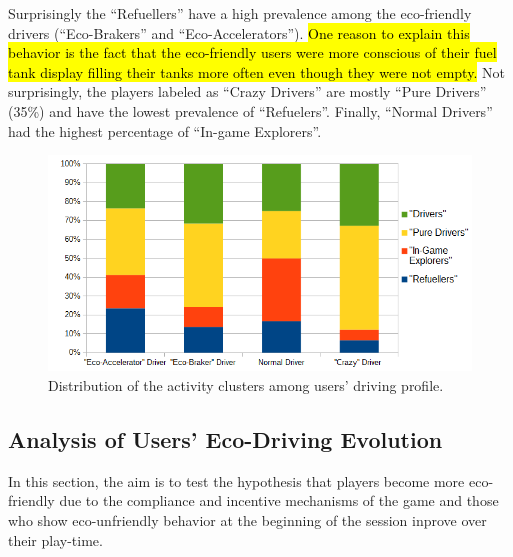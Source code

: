 \documentclass[preprint,authoryear,12pt]{elsarticle}
\begin{document}
Surprisingly the ``Refuellers'' have a high prevalence among the eco-friendly drivers (``Eco-Brakers'' and ``Eco-Accelerators''). \hl{One reason to explain this behavior is the fact that the eco-friendly users were more conscious of their fuel tank display filling their tanks more often even though they were not empty.}
Not surprisingly, the players labeled as ``Crazy Drivers'' are mostly ``Pure Drivers'' (35\%) and have the lowest prevalence of ``Refuelers''.
Finally, ``Normal Drivers'' had the highest percentage of ``In-game Explorers''.

\begin{figure}[htb]
	\begin{center}
		\includegraphics[width=.8\linewidth]{ijhcs14-img/cluster_activities_driver_types}
		\caption{Distribution of the activity clusters among users' driving profile.\label{fig:activity_driving}}
	\end{center}
\end{figure}



\subsection{Analysis of Users' Eco-Driving Evolution}
\label{subsec:eco-friendliness_over_time}

In this section, the aim is to test the hypothesis that players become more eco-friendly due to the compliance and incentive mechanisms of the game and those who show eco-unfriendly behavior at the beginning of the session inprove over their play-time. 
\end{document}

